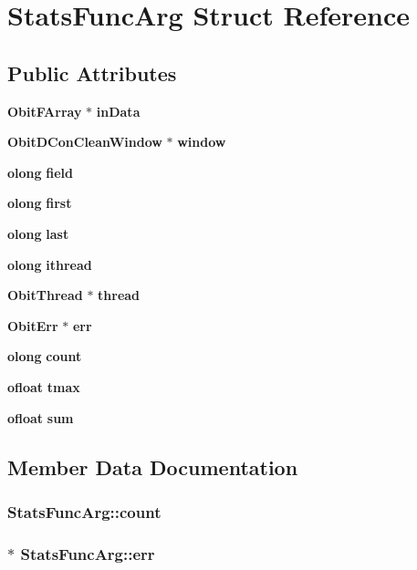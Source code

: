 \section{Stats\-Func\-Arg Struct Reference}
\label{structStatsFuncArg}
\subsection*{Public Attributes}
\begin{CompactItemize}
\item 
{\bf Obit\-FArray} $\ast$ {\bf in\-Data}
\item 
{\bf Obit\-DCon\-Clean\-Window} $\ast$ {\bf window}
\item 
{\bf olong} {\bf field}
\item 
{\bf olong} {\bf first}
\item 
{\bf olong} {\bf last}
\item 
{\bf olong} {\bf ithread}
\item 
{\bf Obit\-Thread} $\ast$ {\bf thread}
\item 
{\bf Obit\-Err} $\ast$ {\bf err}
\item 
{\bf olong} {\bf count}
\item 
{\bf ofloat} {\bf tmax}
\item 
{\bf ofloat} {\bf sum}
\end{CompactItemize}


\subsection{Member Data Documentation}
\subsubsection{ {\bf Stats\-Func\-Arg::count}}\label{structStatsFuncArg_o8}


\subsubsection{$\ast$ {\bf Stats\-Func\-Arg::err}}\label{structStatsFuncArg_o7}



